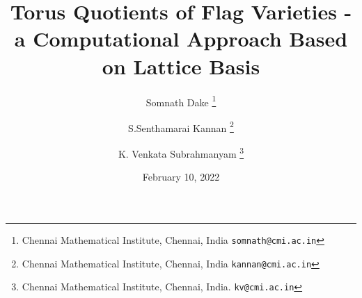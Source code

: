 
\usepackage{tikz-cd}

\author{
Somnath Dake \thanks{Chennai Mathematical Institute, Chennai, India \tt{somnath@cmi.ac.in}}
\and
S.Senthamarai Kannan \thanks{Chennai Mathematical Institute, Chennai, India \tt{kannan@cmi.ac.in}}
\and 
K. Venkata Subrahmanyam \thanks {Chennai Mathematical Institute, Chennai, India. \tt{kv@cmi.ac.in}}
}

\title{Torus Quotients of Flag Varieties - a Computational Approach Based on Lattice Basis} 
\date{February 10, 2022} 

\maketitle
%






%





\appendix




